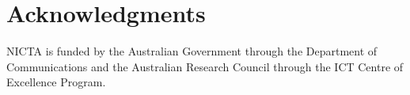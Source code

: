 \documentclass{article}
\begin{document}
\section*{Acknowledgments}
NICTA is funded by the Australian Government 
through the Department of Communications 
and the Australian Research Council 
through the ICT Centre of Excellence Program. 



\end{document}

